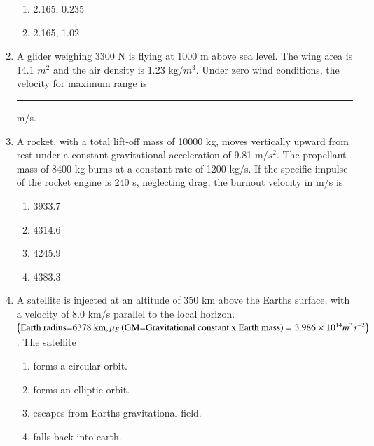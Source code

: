 \documentclass[journal]{IEEEtran}
\numberwithin{equation}{enumi}
\numberwithin{figure}{enumi}
\begin{document}
\begin{enumerate}
\begin{enumerate}
\item 2.165, 0.235
\item 2.165, 1.02
\end{enumerate}
\item A glider weighing 3300 N is flying at 1000 m above sea level. The wing area is 14.1 $m^2$ and the air density is 1.23 kg/$m^3$. Under zero wind conditions, the velocity for maximum range is \rule{1cm}{0.4pt} m/s.
	\begin{table}[H]
		\centering
		
	\end{table}
\item A rocket, with a total lift-off mass of 10000 kg, moves vertically upward from rest under a constant gravitational acceleration of 9.81 m/$s^2$. The propellant mass of 8400 kg burns at a constant rate of 1200 kg/s. If the specific impulse of the rocket engine is 240 s, neglecting drag, the burnout velocity in m/s is
\begin{enumerate}
\item 3933.7
\item 4314.6
\item 4245.9
\item 4383.3
\end{enumerate}
\item A satellite is injected at an altitude of 350 km above the Earths surface, with a velocity of 8.0 km/s parallel to the local horizon. $\left(\text{Earth radius=6378 km}, \mu_E \left(\text{GM=Gravitational
	constant x Earth mass}\right) = 3.986\times10^{14} m^3s^{-2}\right) $. The satellite
\begin{enumerate}
\item forms a circular orbit.
\item forms an elliptic orbit.
\item escapes from Earths gravitational field.
\item falls back into earth.
\end{enumerate}

\end{enumerate}
\end{document}
